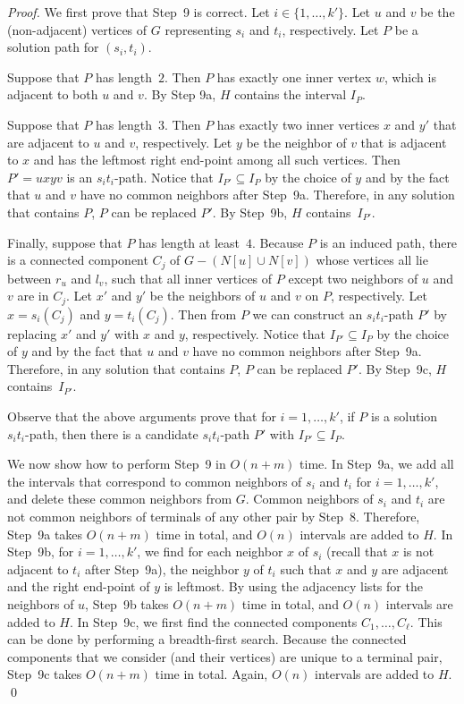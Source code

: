 \documentclass{llncs}
\begin{document}
\begin{proof}
We first prove that Step~9 is correct.
Let $i\in \{1,\ldots,k'\}$.
Let $u$ and $v$ be the (non-adjacent) vertices of $G$ representing $s_i$ and $t_i$, respectively.
Let $P$ be a solution path for $(s_i,t_i)$. 
 
Suppose that  $P$ has length~$2$.
Then $P$ has exactly one inner vertex $w$, which is adjacent to  both $u$ and $v$.
By Step 9a, $H$ contains the interval $I_P$.
 
Suppose that $P$ has length~$3$.
Then $P$ has exactly two inner vertices $x$ and $y'$ that are adjacent to $u$ and $v$, respectively.
Let $y$ be the neighbor of $v$ that is adjacent to $x$ and has the leftmost right end-point among all such vertices. Then $P' = uxyv$ is an $s_it_i$-path. Notice that $I_{P'} \subseteq I_{P}$ by the choice of $y$ and by the fact that $u$ and $v$ have no common neighbors after Step~9a. Therefore, in any solution that contains $P$, $P$ can be replaced $P'$. By Step~9b, $H$ contains~$I_{P'}$.

Finally, suppose that $P$ has length at least~$4$. 
Because $P$ is an induced path, there is a connected component $C_j$ of $G - (N[u] \cup N[v])$ whose vertices all lie between $r_{u}$ and $l_{v}$, such that all inner vertices of $P$ except two neighbors of $u$ and $v$ are in $C_j$. 
Let $x'$ and $y'$ be the neighbors of $u$ and $v$ on $P$, respectively.
Let $x = s_{i}(C_{j})$ and $y=t_{i}(C_{j})$. Then from $P$ we can construct an $s_it_i$-path $P'$ by replacing $x'$ and $y'$ with $x$ and $y$, respectively.
Notice that $I_{P'} \subseteq I_{P}$ by the choice of $y$ and by the fact that $u$ and $v$ have no common neighbors after Step~9a. Therefore, in any solution that contains $P$, $P$ can be replaced $P'$. By Step~9c, $H$ contains~$I_{P'}$.

Observe that the above arguments prove that for $i=1,\ldots,k'$, if $P$ is a solution $s_it_i$-path, then there is a candidate $s_it_i$-path $P'$ with $I_{P'} \subseteq I_{P}$.

We now show how to perform Step~9 in $O(n+m)$ time.
In Step~9a, we add all the intervals that correspond to common neighbors of $s_{i}$ and $t_{i}$ for $i=1,\ldots,k'$, and delete these common neighbors from $G$. 
Common neighbors of $s_i$ and $t_i$ are not common neighbors of terminals of any other pair by Step~8. Therefore, Step~9a takes $O(n+m)$ time in total, and $O(n)$ intervals are added to $H$.
In Step~9b, for $i=1,\ldots,k'$, we find for each neighbor $x$ of $s_{i}$ 
(recall that $x$ is not adjacent to $t_i$ after Step~9a),
 the neighbor $y$ of $t_{i}$ such that $x$ and $y$ are adjacent and the right end-point of $y$ is leftmost. 
By using the adjacency lists for the neighbors of $u$, Step~9b takes $O(n+m)$ time in total, and $O(n)$ intervals are added to $H$.
In Step~9c, we first find the connected components $C_{1},\ldots,C_{\ell}$. This can be done by performing a breadth-first search. 
Because the connected components that we consider (and their vertices) are unique to a terminal pair, Step~9c takes $O(n+m)$ time in total. 
Again, $O(n)$ intervals are added to $H$.
\qed
\end{proof}
\end{document}
